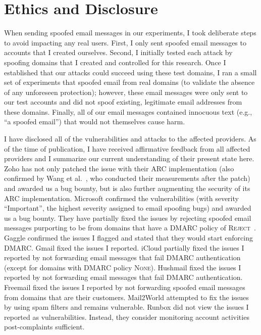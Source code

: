 \section{Ethics and Disclosure}
\label{sec:disclosure}
When sending spoofed email messages in our experiments,
I took deliberate steps to avoid impacting any real users.
First, I only sent spoofed email messages to accounts that I created ourselves.
Second, I initially tested each attack by spoofing domains that I created and controlled for this research.
Once I established that our attacks could succeed using these test domains,
I ran a small set of experiments that spoofed email from real domains (to validate the absence of any unforeseen protection);
however, these email messages were only sent to our test accounts and did not spoof existing, legitimate email addresses from these domains.
Finally, all of our email messages contained innocuous text (e.g., ``a spoofed email'') that would not themselves cause harm.

I have disclosed all of the vulnerabilities and attacks to the
affected providers. As of the time of publication, I have received
affirmative feedback from all affected providers and I summarize our
current understanding of their present state here. Zoho has not only
patched the issue with their ARC implementation (also confirmed by
Wang et al.~\cite{wang2022revisiting}, who conducted their
measurements after the patch) and awarded us a bug bounty, but is also
further augmenting the security of its ARC implementation. Microsoft
confirmed the vulnerabilities (with severity ``Important'', the
highest severity assigned to email spoofing bugs) and awarded us a bug
bounty. They have partially fixed the issues by rejecting spoofed email
messages purporting to be from domains that have a DMARC policy of
\textsc{Reject}~\cite{hotmailreject}.
Gaggle confirmed the issues I flagged and stated that they would
start enforcing DMARC. Gmail fixed the issues I reported.  iCloud
partially fixed the issues I reported by not forwarding email
messages that fail DMARC authentication (except for domains with DMARC
policy \textsc{None}). Hushmail fixed the issues I reported by not
forwarding email messages that fail DMARC authentication. Freemail
fixed the issues I reported by not forwarding spoofed email messages
from domains that are their customers. Mail2World attempted to fix the
issues by using spam filters and remains vulnerable. Runbox did not
view the issues I reported as vulnerabilities. Instead, they consider
monitoring account activities post-complaints sufficient.
